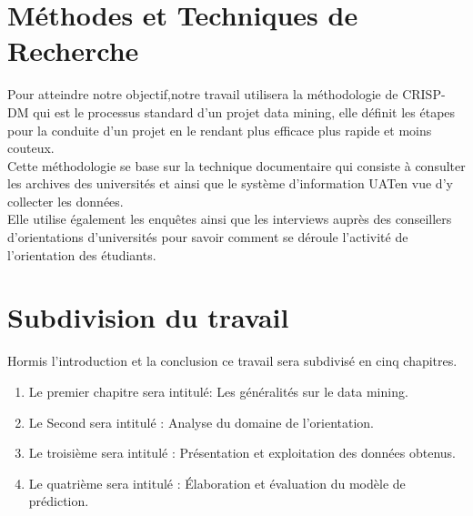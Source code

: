 \section{Méthodes et Techniques de Recherche}
Pour atteindre notre objectif,notre  travail utilisera la méthodologie de \ac{CRISP-DM} qui est le processus standard d’un projet data mining, elle définit les étapes pour la conduite d’un projet en le rendant plus efficace plus rapide et moins couteux. \cite{DMProces}  \\
Cette méthodologie se base sur la technique documentaire qui consiste à consulter les archives des universités et ainsi que le système d'information \ac{UAT}en vue d'y collecter les données. \\
Elle utilise également les enquêtes ainsi que les interviews auprès des conseillers d'orientations d'universités pour savoir comment se déroule l'activité de l'orientation des étudiants.
\section{Subdivision du travail}
Hormis l'introduction et la conclusion ce travail sera subdivisé en cinq chapitres.  
\begin{enumerate}
	\item Le premier chapitre sera intitulé: Les généralités sur le data mining.
	\item Le Second sera intitulé : Analyse du domaine de l'orientation.
	\item Le troisième sera intitulé : Présentation et exploitation des données obtenus. 
	\item Le quatrième sera intitulé : Élaboration  et évaluation du modèle de prédiction.
\end{enumerate}

